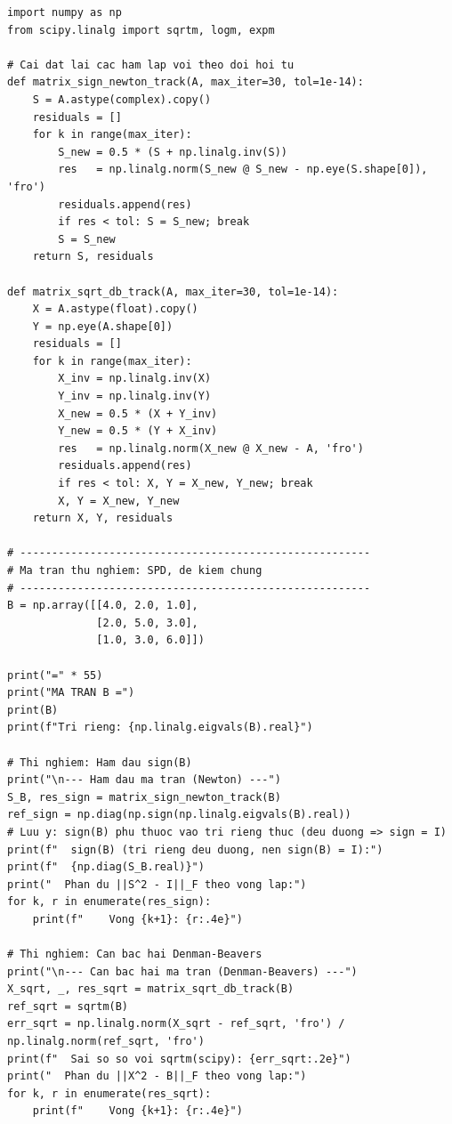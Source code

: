 \documentclass[12pt,a4paper]{report}
\begin{document}
\begin{lstlisting}[style=python, caption={Thực nghiệm 4: hội tụ bậc hai của lặp Newton và Denman-Beavers}]
import numpy as np
from scipy.linalg import sqrtm, logm, expm

# Cai dat lai cac ham lap voi theo doi hoi tu
def matrix_sign_newton_track(A, max_iter=30, tol=1e-14):
    S = A.astype(complex).copy()
    residuals = []
    for k in range(max_iter):
        S_new = 0.5 * (S + np.linalg.inv(S))
        res   = np.linalg.norm(S_new @ S_new - np.eye(S.shape[0]), 'fro')
        residuals.append(res)
        if res < tol: S = S_new; break
        S = S_new
    return S, residuals

def matrix_sqrt_db_track(A, max_iter=30, tol=1e-14):
    X = A.astype(float).copy()
    Y = np.eye(A.shape[0])
    residuals = []
    for k in range(max_iter):
        X_inv = np.linalg.inv(X)
        Y_inv = np.linalg.inv(Y)
        X_new = 0.5 * (X + Y_inv)
        Y_new = 0.5 * (Y + X_inv)
        res   = np.linalg.norm(X_new @ X_new - A, 'fro')
        residuals.append(res)
        if res < tol: X, Y = X_new, Y_new; break
        X, Y = X_new, Y_new
    return X, Y, residuals

# -------------------------------------------------------
# Ma tran thu nghiem: SPD, de kiem chung
# -------------------------------------------------------
B = np.array([[4.0, 2.0, 1.0],
              [2.0, 5.0, 3.0],
              [1.0, 3.0, 6.0]])

print("=" * 55)
print("MA TRAN B =")
print(B)
print(f"Tri rieng: {np.linalg.eigvals(B).real}")

# Thi nghiem: Ham dau sign(B)
print("\n--- Ham dau ma tran (Newton) ---")
S_B, res_sign = matrix_sign_newton_track(B)
ref_sign = np.diag(np.sign(np.linalg.eigvals(B).real))
# Luu y: sign(B) phu thuoc vao tri rieng thuc (deu duong => sign = I)
print(f"  sign(B) (tri rieng deu duong, nen sign(B) = I):")
print(f"  {np.diag(S_B.real)}")
print("  Phan du ||S^2 - I||_F theo vong lap:")
for k, r in enumerate(res_sign):
    print(f"    Vong {k+1}: {r:.4e}")

# Thi nghiem: Can bac hai Denman-Beavers
print("\n--- Can bac hai ma tran (Denman-Beavers) ---")
X_sqrt, _, res_sqrt = matrix_sqrt_db_track(B)
ref_sqrt = sqrtm(B)
err_sqrt = np.linalg.norm(X_sqrt - ref_sqrt, 'fro') / np.linalg.norm(ref_sqrt, 'fro')
print(f"  Sai so so voi sqrtm(scipy): {err_sqrt:.2e}")
print("  Phan du ||X^2 - B||_F theo vong lap:")
for k, r in enumerate(res_sqrt):
    print(f"    Vong {k+1}: {r:.4e}")


\end{lstlisting}
\end{document}
